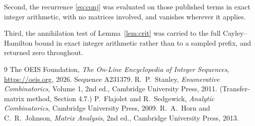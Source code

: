 \documentclass[11pt,a4paper]{article}
\theoremstyle{plain}
\theoremstyle{definition}
\begin{document}
Second, the recurrence \eqref{eq:conj} was evaluated on those published terms in exact
integer arithmetic, with no matrices involved, and vanishes wherever it applies.

Third, the annihilation test of Lemma~\ref{lem:crit} was carried to the full
Cayley--Hamilton bound in exact integer arithmetic rather than to a sampled prefix, and
returned zero throughout.

\begin{thebibliography}{9}
 The OEIS Foundation, \emph{The On-Line Encyclopedia of Integer
Sequences}, \url{https://oeis.org}, 2026. Sequence A231379.
 R.~P.~Stanley, \emph{Enumerative Combinatorics}, Volume 1, 2nd ed.,
Cambridge University Press, 2011. (Transfer-matrix method, Section 4.7.)
 P.~Flajolet and R.~Sedgewick, \emph{Analytic Combinatorics}, Cambridge
University Press, 2009.
 R.~A.~Horn and C.~R.~Johnson, \emph{Matrix Analysis}, 2nd ed., Cambridge
University Press, 2013.
\end{thebibliography}
\end{document}
